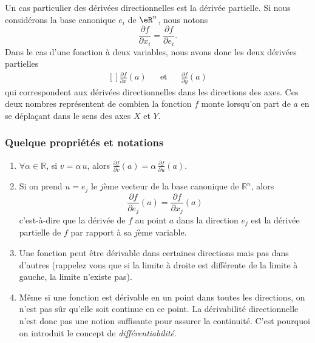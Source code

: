 Un cas particulier des dérivées directionnelles est la dérivée partielle. Si nous considérons la base canonique $e_i$ de $\eR^n$, nous notons
\begin{equation}
    \frac{ \partial f }{ \partial x_i }=\frac{ \partial f }{ \partial e_i }.
\end{equation}
Dans le cas d'une fonction à deux variables, nous avons donc les deux dérivées partielles
\begin{equation}
    \begin{aligned}[]
        \frac{ \partial f }{ \partial x }(a)&&\text{et}&&\frac{ \partial f }{ \partial y }(a)
    \end{aligned}
\end{equation}
qui correspondent aux dérivées directionnelles dans les directions des axes. Ces deux nombres représentent de combien la fonction $f$ monte lorsqu'on part de $a$ en se déplaçant dans le sens des axes $X$ et $Y$.

                    \subsubsection{Quelque propriétés et notations}

\begin{enumerate}
\item
 $\forall \alpha \in \mathbb{R}$,
si $v = \alpha\,u$, alors $\frac{\partial f}{\partial v}(a) =
\alpha\,\frac{\partial f}{\partial u}(a)$.
\item Si on prend $u=e_j$ le $j$ème vecteur de la base canonique de
$\mathbb{R}^n$, alors
$$\frac{\partial f}{\partial e_j}(a) = \frac{\partial f}{\partial
x_j}(a)$$ c'est-à-dire que la dérivée de $f$ au point $a$ dans la
direction $e_j$ est la dérivée partielle de $f$ par rapport à sa
$j$ème variable.

\item 
Une fonction peut être dérivable dans certaines directions
mais pas dans d'autres (rappelez vous que si la limite à droite est
différente de la limite à gauche, la limite n'existe pas). 

\item
Même si une fonction est dérivable en un point dans toutes les
directions, on n'est pas sûr qu'elle soit continue en ce point. La
dérivabilité directionnelle n'est donc pas une notion suffisante
pour assurer la continuité. C'est pourquoi on introduit le concept
de \emph{différentiabilité}. 
\end{enumerate}

